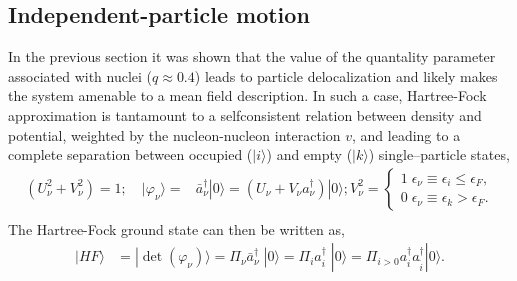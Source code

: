  \subsection{Independent-particle motion}\label{C1S1D1}
In the previous section it was shown that the value of the quantality parameter associated with nuclei ($q\approx 0.4$) leads to particle delocalization and likely makes the system amenable to a mean field description. In such a case, Hartree-Fock approximation is tantamount to a selfconsistent relation between density and potential, weighted by the nucleon-nucleon interaction $v$, and
  leading to a  complete separation between occupied ($|i\rangle$) and empty ($|k\rangle$) single--particle states,
 \begin{equation}
\begin{split}
\left(U^2_\nu+V_\nu^2\right)=1;\quad |\varphi_\nu\rangle=&\bar a_\nu^{\dagger}|0\rangle=\left(U_\nu+V_\nu a_\nu^{\dagger}\right)|0\rangle; V^2_\nu=\left\{\begin{array}{c}
1\;\epsilon_\nu\equiv\epsilon_i\leq \epsilon_F, \\ 
0\; \epsilon_\nu\equiv\epsilon_k>\epsilon_F.
\end{array}\right.\\ 
\end{split}
\end{equation}
The Hartree-Fock ground state can then be written as, 
 \begin{equation}
\begin{split}
|HF\rangle&=|\det(\varphi_\nu)\rangle=\Pi_\nu \bar a_\nu^{\dagger}\; |0\rangle=\Pi_i a_i^{\dagger}\; |0\rangle=\Pi_{i>0} a_i^{\dagger}a_{\tilde i}^{\dagger}|0\rangle.\\
\end{split}
\end{equation}
